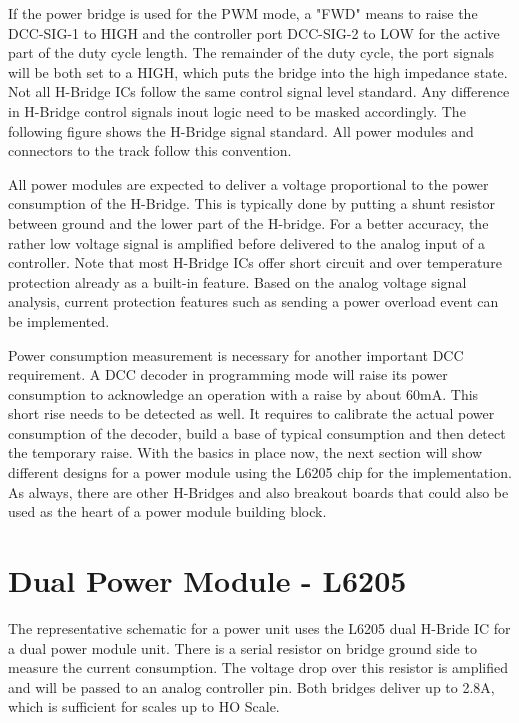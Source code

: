 If the power bridge is used for the PWM mode, a "FWD" means to raise  the DCC-SIG-1 to HIGH and the controller port DCC-SIG-2 to LOW for the active part of the duty cycle length. The remainder of the duty cycle, the port signals will be both set to a HIGH, which puts the bridge into the high impedance state. Not all H-Bridge ICs follow the same control signal level standard. Any difference in H-Bridge control signals inout logic need to be masked accordingly. The following figure shows the H-Bridge signal standard. All power modules and connectors to the track follow this convention.

All power modules are expected to deliver a voltage proportional to the power consumption of the H-Bridge. This is typically done by putting a shunt resistor between ground and the lower part of the H-bridge. For a better accuracy, the rather low voltage signal is amplified before delivered to the analog input of a controller. Note that most H-Bridge ICs offer short circuit and over temperature protection already as a built-in feature. Based on the analog voltage signal analysis, current protection features such as sending a power overload event can be implemented.

Power consumption measurement is necessary for another important DCC requirement. A DCC decoder in programming mode will raise its power consumption to acknowledge an operation with a raise by about 60mA. This short rise needs to be detected as well. It requires to calibrate the actual power consumption of the decoder, build a base of typical consumption and then detect the temporary raise. With the basics in place now, the next section will show different designs for a power module using the L6205 chip for the implementation. As always, there are other H-Bridges and also breakout boards that could also be used as the heart of a power module building block.

\section{Dual Power Module - L6205}

The representative schematic for a power unit uses the L6205 dual H-Bride IC for a dual power module unit. There is a serial resistor on bridge ground side to measure the current consumption. The voltage drop over this resistor is amplified and will be passed to an analog controller pin. Both bridges deliver up to 2.8A, which is sufficient for scales up to HO Scale.

\FloatBarrier

